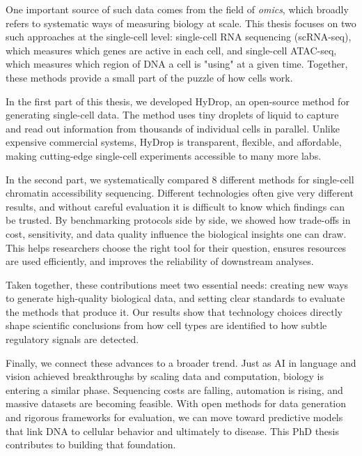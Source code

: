 One important source of such data comes from the field of \textit{omics}, which broadly refers to systematic ways of measuring biology at scale. This thesis focuses on two such approaches at the single-cell level: single-cell RNA sequencing (scRNA-seq), which measures which genes are active in each cell, and single-cell ATAC-seq, which measures which region of DNA a cell is "using" at a given time. Together, these methods provide a small part of the puzzle of how cells work.

In the first part of this thesis, we developed HyDrop, an open-source method for generating single-cell data. The method uses tiny droplets of liquid to capture and read out information from thousands of individual cells in parallel. Unlike expensive commercial systems, HyDrop is transparent, flexible, and affordable, making cutting-edge single-cell experiments accessible to many more labs.

In the second part, we systematically compared 8 different methods for single-cell chromatin accessibility sequencing. Different technologies often give very different results, and without careful evaluation it is difficult to know which findings can be trusted. By benchmarking protocols side by side, we showed how trade-offs in cost, sensitivity, and data quality influence the biological insights one can draw. This helps researchers choose the right tool for their question, ensures resources are used efficiently, and improves the reliability of downstream analyses.

Taken together, these contributions meet two essential needs: creating new ways to generate high-quality biological data, and setting clear standards to evaluate the methods that produce it. Our results show that technology choices directly shape scientific conclusions from how cell types are identified to how subtle regulatory signals are detected.

Finally, we connect these advances to a broader trend. Just as AI in language and vision achieved breakthroughs by scaling data and computation, biology is entering a similar phase. Sequencing costs are falling, automation is rising, and massive datasets are becoming feasible. With open methods for data generation and rigorous frameworks for evaluation, we can move toward predictive models that link DNA to cellular behavior and ultimately to disease. This PhD thesis contributes to building that foundation.

